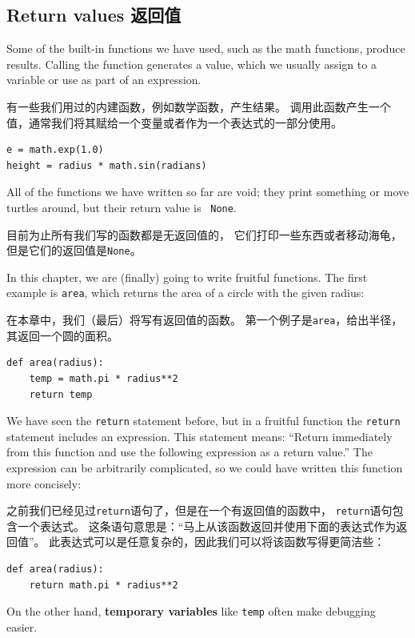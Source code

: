 \documentclass[10pt]{book}
\begin{document}
\begin{CJK}{UTF8}{gbsn}
\section{Return values 返回值}

Some of the built-in functions we have used, such as the math
functions, produce results.  Calling the function generates a
value, which we usually assign to a variable or use as part of an
expression.

有一些我们用过的内建函数，例如数学函数，产生结果。
调用此函数产生一个值，通常我们将其赋给一个变量或者作为一个表达式的一部分使用。

\begin{verbatim}
e = math.exp(1.0)
height = radius * math.sin(radians)
\end{verbatim}
%
All of the functions we have written so far are void; they print
something or move turtles around, but their return value is {\tt
None}.

目前为止所有我们写的函数都是无返回值的，
它们打印一些东西或者移动海龟，但是它们的返回值是{\tt None}。

In this chapter, we are (finally) going to write fruitful functions.
The first example is {\tt area}, which returns the area of a circle
with the given radius:

在本章中，我们（最后）将写有返回值的函数。
第一个例子是{\tt area}，给出半径，其返回一个圆的面积。

\begin{verbatim}
def area(radius):
    temp = math.pi * radius**2
    return temp
\end{verbatim}
%
We have seen the {\tt return} statement before, but in a fruitful
function the {\tt return} statement includes
an expression.  This statement means: ``Return immediately from
this function and use the following expression as a return value.''
The expression can be arbitrarily complicated, so we could
have written this function more concisely:

之前我们已经见过{\tt return}语句了，但是在一个有返回值的函数中，
{\tt return}语句包含一个表达式。
这条语句意思是：``马上从该函数返回并使用下面的表达式作为返回值''。
此表达式可以是任意复杂的，因此我们可以将该函数写得更简洁些：

\begin{verbatim}
def area(radius):
    return math.pi * radius**2
\end{verbatim}
%
On the other hand, {\bf temporary variables} like {\tt temp} often make
debugging easier.


\end{CJK}
\end{document}
